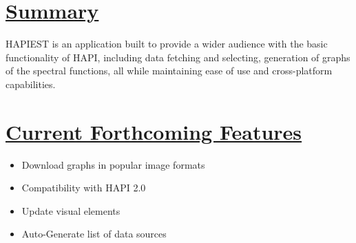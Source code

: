\documentclass[a0,landscape]{a0poster}
\begin{document}
\begin{multicols}{3}
\section*{\underline{Summary}}
HAPIEST is an application built to provide a wider audience with the basic functionality of HAPI, including data fetching and selecting, generation of graphs of the spectral functions, all while maintaining ease of use and cross-platform capabilities.

\section*{\underline{Current Forthcoming Features}}

\begin{itemize}
\item Download graphs in popular image formats
\item Compatibility with HAPI 2.0
\item Update visual elements
\item Auto-Generate list of data sources
\end{itemize}




\end{multicols}
\end{document}
